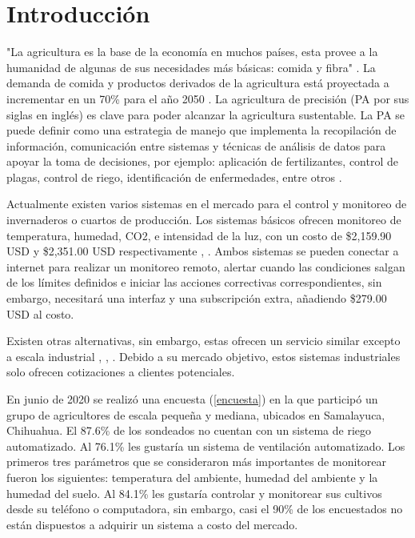 \section*{Introducción}

"La agricultura es la base de la economía en muchos países, esta provee a la humanidad de algunas de sus necesidades más básicas: comida y fibra" \cite{appsremotesensing}. La demanda de comida y productos derivados de la agricultura está proyectada a incrementar en un 70\% para el año 2050 \cite{wik_pingali_brocai_2008}. La agricultura de precisión (PA por sus siglas en inglés) es clave para poder alcanzar la agricultura sustentable. La PA se puede definir como una estrategia de manejo que implementa la recopilación de información, comunicación entre sistemas y técnicas de análisis de datos para apoyar la toma de decisiones, por ejemplo: aplicación de fertilizantes, control de plagas, control de riego, identificación de enfermedades, entre otros \cite{appsremotesensing}.

Actualmente existen varios sistemas en el mercado para el control y monitoreo de invernaderos o cuartos de producción. Los sistemas básicos ofrecen monitoreo de temperatura, humedad, CO2, e intensidad de la luz, con un costo de \$2,159.90 USD y \$2,351.00 USD respectivamente \cite{intelliclimate_kit_2021}, \cite{smartbee_kit_2021}. Ambos sistemas se pueden conectar a internet para realizar un monitoreo remoto, alertar cuando las condiciones salgan de los límites definidos e iniciar las acciones correctivas correspondientes, sin embargo, \cite{intelliclimate_kit_2021} necesitará una interfaz y una subscripción extra, añadiendo \$279.00 USD al costo. 

Existen otras alternativas, sin embargo, estas ofrecen un servicio similar excepto a escala industrial \cite{ceres_greenhouse_solutions_2021}, \cite{autogrow_climate_control_2021}, \cite{climate_control_2021}. Debido a su mercado objetivo, estos sistemas industriales solo ofrecen cotizaciones a clientes potenciales.

En junio de 2020 se realizó una encuesta (\ref{encuesta}) en la que participó un grupo de agricultores de escala pequeña y mediana, ubicados en Samalayuca, Chihuahua. El 87.6\% de los sondeados no cuentan con un sistema de riego automatizado. Al 76.1\% les gustaría un sistema de ventilación automatizado. Los primeros tres parámetros que se consideraron más importantes de monitorear fueron los siguientes: temperatura del ambiente, humedad del ambiente y la humedad del suelo. Al 84.1\% les gustaría controlar y monitorear sus cultivos desde su teléfono o computadora, sin embargo, casi el 90\% de los encuestados no están dispuestos a adquirir un sistema a costo del mercado.

